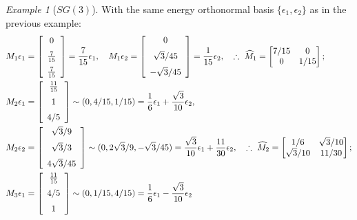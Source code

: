 \documentclass[a4paper]{amsart}
\theoremstyle{plain}
\theoremstyle{definition}
\theoremstyle{remark}
\newtheorem{example}[theorem]{Example}
\begin{document}
\begin{example}[$ SG(3) $]
With the same energy orthonormal basis $ \{\epsilon_1, \epsilon_2 \} $  as in the previous example:
\begin{align*}
M_1 \epsilon_1  &=  \left[ \begin {array}{c} 0\\\noalign{\medskip}{\frac {7}{15}}
\\\noalign{\medskip}{\frac {7}{15}}\end {array} \right] 
  = \frac{7}{15}\epsilon_1,
\quad 
M_1 \epsilon_2  =  \left[ \begin {array}{c} 0\\\noalign{\medskip}\sqrt {3}/45
\\\noalign{\medskip}-\sqrt {3}/45\end {array} \right] 
  =  \frac{1}{15}\epsilon_2, \quad 
\therefore\ \widehat{M}_1  = \begin{bmatrix}  7/15 & 0 \\ 0 & 1/15         \end{bmatrix};
\\
M_2 \epsilon_1  &=  \left[ \begin {array}{c} {\frac {11}{15}}\\\noalign{\medskip}1
\\\noalign{\medskip}4/5\end {array} \right] \sim (0, 4/15, 1/15) = \frac{1}{6}\epsilon_1 + \frac{\sqrt{3}}{10} \epsilon_2
,
\\
M_2 \epsilon_2  &=   \left[ \begin {array}{c} \sqrt {3}/9\\\noalign{\medskip}\sqrt {3}/3 \\\noalign{\medskip} 4\sqrt {3}/45\end {array}  \right] \sim (0, 2\sqrt{3}/9, -\sqrt{3}/45) = \frac{\sqrt{3}} {10}\epsilon_1 + \frac{11}{30} \epsilon_2 
 ,
\quad 
\therefore\ \widehat{M}_2  = \begin{bmatrix} 1/6 & \sqrt{3}/10\\\sqrt{3}/10 & 11/30 \end{bmatrix}
;
\\
M_3 \epsilon_1  &=  \left[ \begin {array}{c} {\frac {11}{15}}\\\noalign{\medskip}4/5
\\\noalign{\medskip}1\end {array} \right] \sim (0,1/15,4/15) = \frac{1}{6}\epsilon_1 -\frac{\sqrt{3}}{10}\epsilon_2

\end{align*}
\end{example}
\end{document}
